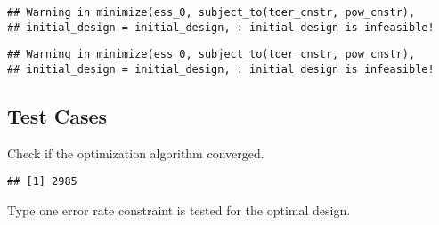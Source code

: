 \documentclass[]{book}
\newenvironment{Shaded}{\begin{snugshade}}{\end{snugshade}}
\newcommand{\KeywordTok}[1]{\textcolor[rgb]{0.13,0.29,0.53}{\textbf{#1}}}
\newcommand{\NormalTok}[1]{#1}
\newcommand{\OperatorTok}[1]{\textcolor[rgb]{0.81,0.36,0.00}{\textbf{#1}}}
\newcommand{\StringTok}[1]{\textcolor[rgb]{0.31,0.60,0.02}{#1}}
\begin{document}
\begin{verbatim}
## Warning in minimize(ess_0, subject_to(toer_cnstr, pow_cnstr),
## initial_design = initial_design, : initial design is infeasible!
\end{verbatim}

\begin{Shaded}
\end{Shaded}

\begin{verbatim}
## Warning in minimize(ess_0, subject_to(toer_cnstr, pow_cnstr),
## initial_design = initial_design, : initial design is infeasible!
\end{verbatim}

\hypertarget{test-cases-4}{%
\subsection{Test Cases}\label{test-cases-4}}

Check if the optimization algorithm converged.

\begin{Shaded}
\end{Shaded}

\begin{verbatim}
## [1] 2985
\end{verbatim}

\begin{Shaded}
\end{Shaded}

Type one error rate constraint is tested for the optimal design.
\end{document}
